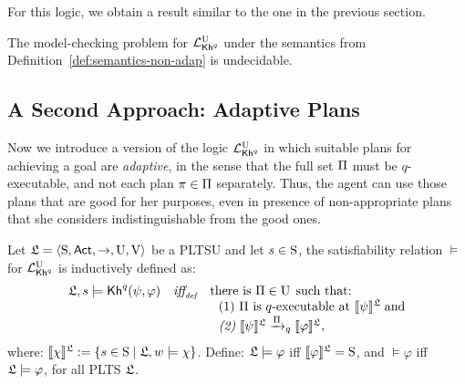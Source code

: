 For this logic, we obtain a result similar to the one in the previous section.

\begin{theorem}\label{th:mc-khp-nadapt-undecidable}
    The model-checking problem for $\PKhunc$ under the semantics from Definition~\ref{def:semantics-non-adap} is undecidable.
\end{theorem}


\subsection{A Second Approach: Adaptive Plans}

Now we introduce a version of the logic $\PKhunc$ in which suitable plans for achieving a goal are \emph{adaptive}, in the sense that the full set $\plans$ must be $q$-executable, and not each plan $\plan\in\plans$ separately. Thus, the agent can use those plans that are good for her purposes, even in presence of non-appropriate plans that she considers indistinguishable from the good ones. 

\begin{definition} \label{def:semantics-adap}
    Let $\model = \tup{\S,\ACT,\ra,\Unc,\V}$ be a PLTSU and let $s\in\S$, the satisfiability relation $\models$ for $\PKhunc$ is inductively defined as:
    \[
    \begin{array}{l@{\ \ \ }c@{\ \ \  }l}
    \model, s \models \kh^q(\psi,\varphi) & \iffdef & \text{there is } \plans \in \Unc \;\text{such that:} \\
    & & \ \ \text{\rm (1)} \ \plans \text{ is $q$-executable at }  \truthset{\model}{\psi}\; \text{and} \\
    & & \ \ \text{\em (2)} \ \truthset{\model}{\psi} \reach{\plans}_q \truthset{\model}{\varphi}, 
    \end{array}
    \]     
    \noindent where: $\truthset{\model}{\chi} := \csetsc{s\in\S}{\model,w\models\chi}$. Define: $\model\models\varphi$ iff  $\truthset{\model}{\varphi}=\S$, and $\models\varphi$ iff $\model\models\varphi$, for all PLTS $\model$.
\end{definition}

